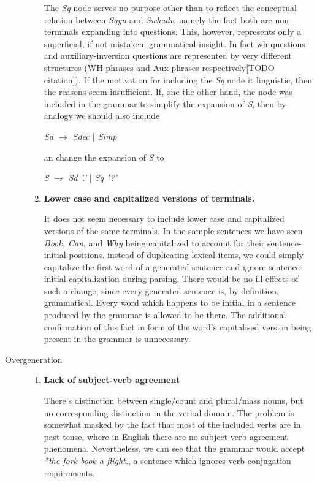 \documentclass{article}
\begin{document}
\begin{description}
\begin{enumerate}
		The \emph{Sq} node serves no purpose other than to reflect the conceptual relation between \emph{Sqyn} and \emph{Swhadv}, namely the fact both are non-terminals expanding into questions. This, however, represents only a superficial, if not mistaken, grammatical insight. In fact wh-questions and auxiliary-inversion questions are represented by very different structures (WH-phrases and Aux-phrases respectively[TODO citation]). If the motivation for including the \emph{Sq} node it linguistic, then the reasons seem insufficient.
		If, one the other hand, the node was included in the grammar to simplify the expansion of \emph{S}, then by analogy we should also include
		\begin{center}
			
			\emph{Sd $\rightarrow$ Sdec $\vert$ Simp}
			
		\end{center}an change the expansion of \emph{S} to
		\begin{center}
			
			\emph{S $\rightarrow$ Sd '.' $\vert$ Sq '?'}
			
		\end{center}
		
		\item
		\textbf{Lower case and capitalized versions of terminals.}
		
		It does not seem necessary to include lower case and capitalized versions of the same terminals. In the sample sentences we have seen \textit{Book, Can}, and \textit{Why} being capitalized to account for their sentence-initial positions. instead of duplicating lexical items, we could simply capitalize  the first word of a generated sentence and ignore sentence-initial capitalization during parsing.
		There would be no ill effects of such a change, since every generated sentence is, by definition, grammatical. Every word which happens to be initial in a sentence produced by the grammar is allowed to be there. The additional confirmation of this fact in form of the word's capitalised version being present in the grammar is unnecessary.
	\end{enumerate}
	\item[Overgeneration]
	\begin{enumerate}
		\item
		\textbf{Lack of subject-verb agreement}
		
		There’s distinction between single/count and plural/mass nouns, but no corresponding distinction in the verbal domain. The problem is somewhat masked by the fact that most of the included verbs are in past tense, where in English there are no subject-verb agreement phenomena. Nevertheless, we can see that the grammar would accept  \emph{*the fork book a flight.}, a sentence which ignores verb conjugation requirements.
		

\end{enumerate}
\end{description}
\end{document}
